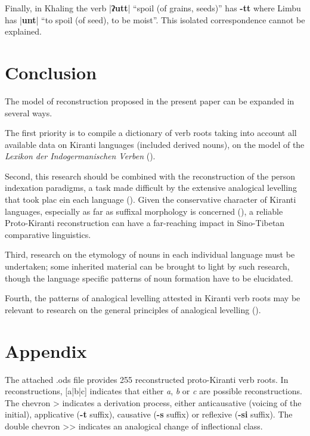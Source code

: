 \documentclass[oldfontcommands,oneside,a4paper,11pt]{article}
\newcommand{\ipa}[1]{\textbf{{\phon\mbox{#1}}}} %
\newcommand{\dhatu}[2]{|\ipa{#1}| ``#2''}
\begin{document}
Finally, in Khaling the verb \dhatu{ʔutt}{spoil (of grains, seeds)} has \ipa{-tt} where Limbu has \dhatu{unt}{to spoil (of seed), to be moist}. This isolated correspondence cannot be explained.


 \section{Conclusion}
The model of reconstruction proposed in the present paper can be expanded in several ways. 

The first priority is to compile a dictionary of verb roots taking into account all available data on Kiranti languages (included derived nouns), on the model of the \textit{Lexikon der Indogermanischen Verben} (\citealt{liv}).

Second, this research should be combined with the reconstruction of the person indexation paradigms, a task made difficult by the extensive analogical levelling that took plac ein each language (\citealt{jacques16tonogenesis}). Given the conservative character of Kiranti languages, especially as far as suffixal morphology is concerned (\citealt{driem93agreement, delancey10agreement, jacques12agreement}), a reliable Proto-Kiranti reconstruction can  have a far-reaching impact in Sino-Tibetan comparative linguistics.

Third, research on the etymology of nouns in each individual language must be undertaken; some inherited material can be brought to light by such research, though the  language specific patterns of noun formation have to be elucidated.


Fourth, the patterns of analogical levelling attested in Kiranti verb roots may be relevant to research on the general principles of analogical levelling (\citealt{hill07ausgleich, hill14conditioned,jacques16ebde}).


\section{Appendix} \label{sec:appendix}
The attached .ods file provides 255 reconstructed proto-Kiranti verb roots. In reconstructions, [a|b|c] indicates that either \textit{a}, \textit{b} or \textit{c} are possible reconstructions. The chevron > indicates a derivation process, either anticausative (voicing of the initial), applicative (\ipa{-t} suffix), causative (\ipa{-s} suffix) or reflexive (\ipa{-si} suffix). The double chevron {>}{>} indicates an analogical change of inflectional class.
\end{document}
